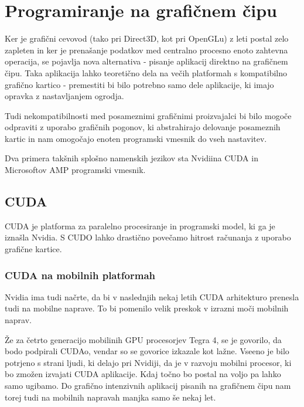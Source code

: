 \chapter{Programiranje na grafičnem čipu}


Ker je grafični cevovod (tako pri Direct3D, kot pri OpenGLu) z leti postal zelo zapleten in ker je prenašanje podatkov med centralno procesno enoto zahtevna operacija, se pojavlja nova alternativa - pisanje aplikacij direktno na grafičnem čipu. Taka aplikacija lahko teoretično dela na večih platformah s kompatibilno grafično kartico - premestiti bi bilo potrebno samo dele aplikacije, ki imajo opravka z nastavljanjem ogrodja. 

Tudi nekompatibilnosti med posameznimi grafičnimi proizvajalci bi bilo mogoče odpraviti z uporabo grafičnih pogonov, ki abstrahirajo delovanje posameznih kartic in nam omogočajo enoten programski vmesnik do vseh nastavitev.

Dva primera takšnih splošno namenskih jezikov sta Nvidiina CUDA in Microsoftov AMP programski vmesnik.

\section{CUDA}
CUDA je platforma za paralelno procesiranje in programski model, ki ga je iznašla Nvidia. S CUDO lahko drastično povečamo hitrost računanja z uporabo grafične kartice.

\subsection{CUDA na mobilnih platformah}


Nvidia ima tudi načrte, da bi v naslednjih nekaj letih CUDA arhitekturo prenesla tudi na mobilne naprave. To bi pomenilo velik preskok v izrazni moči mobilnih naprav.

Že za četrto generacijo mobilinih GPU procesorjev Tegra 4, se je govorilo, da bodo podpirali CUDAo, vendar so se govorice izkazale kot lažne. Vseeno je bilo potrjeno s strani ljudi, ki delajo pri Nvidiji, da je v razvoju mobilni procesor, ki bo zmožen izvajati CUDA aplikacije. Kdaj točno bo postal na voljo pa lahko samo ugibamo. Do grafično intenzivnih aplikacij pisanih na grafičnem čipu nam torej tudi na mobilnih napravah manjka samo še nekaj let.

